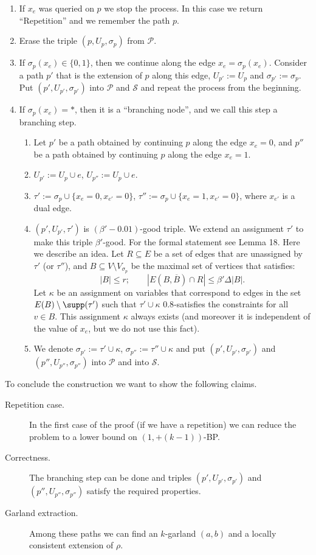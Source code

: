 \begin{enumerate}
\item If $x_e$ was queried on $p$ we stop the process. In this case we return ``Repetition'' and we remember the path $p$.
\item Erase the triple $(p,U_p,\sigma_p)$ from $\mathcal P$.
\item If $\sigma_p(x_e)\in\{0,1\}$, then we continue along the edge $x_e=\sigma_p(x_e)$. Consider a path $p'$ that is the extension of $p$ along this edge, $U_{p'}:=U_p$ and $\sigma_{p'}:=\sigma_p$. Put $(p',U_{p'},\sigma_{p'})$ into $\mathcal P$ and $\mathcal S$ and repeat the process from the beginning.
\item If $\sigma_p(x_e)=*$, then it is a ``branching node'', and we call this step a branching step.
\begin{enumerate}[label=\alph*.]
\item Let $p'$ be a path obtained by continuing $p$ along the edge $x_e=0$, and $p''$ be a path obtained by continuing $p$ along the edge $x_e=1$.
\item $U_{p'}:=U_p\cup e$, $U_{p''}:=U_p\cup e$.
\item $\tau':=\sigma_p\cup\{x_e=0,x_{e'}=0\}$, $\tau'':=\sigma_p\cup\{x_e=1,x_{e'}=0\}$, where $x_{e'}$ is a dual edge.
\item $(p',U_{p'},\tau')$ is $(\beta'-0.01)$-good triple. We extend an assignment $\tau'$ to make this triple $\beta'$-good. For the formal statement see Lemma 18. Here we describe an idea. Let $R\subseteq E$ be a set of edges that are unassigned by $\tau'$ (or $\tau''$), and $B\subseteq V\setminus V_{\sigma_p}$ be the maximal set of vertices that satisfies:
\[|B|\le r;\qquad |E(B,\overline B)\cap R|\le\beta'\Delta|B|.\]
Let $\kappa$ be an assignment on variables that correspond to edges in the set $E(B)\setminus\supp(\tau')$ such that $\tau'\cup\kappa$ $0.8$-satisfies the constraints for all $v\in B$. This assignment $\kappa$ always exists (and moreover it is independent of the value of $x_e$, but we do not use this fact).
\item We denote $\sigma_{p'}:=\tau'\cup\kappa$, $\sigma_{p''}:=\tau''\cup\kappa$ and put $(p',U_{p'},\sigma_{p'})$ and $(p'',U_{p''},\sigma_{p''})$ into $\mathcal P$ and into $\mathcal S$.
\end{enumerate}\end{enumerate}
To conclude the construction we want to show the following claims.
\begin{description}
\item[Repetition case.] In the first case of the proof (if we have a repetition) we can reduce the problem to a lower bound on $(1,+(k-1))$-BP.
\item[Correctness.] The branching step can be done and triples $(p',U_{p'},\sigma_{p'})$ and $(p'',U_{p''},\sigma_{p''})$ satisfy the required properties.
\item[Garland extraction.] Among these paths we can find an $k$-garland $(a,b)$ and a locally consistent extension of $\rho$.
\end{description}
